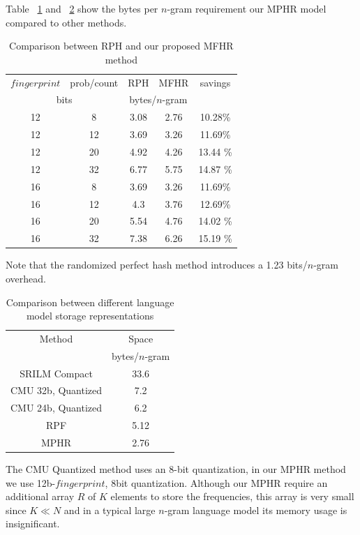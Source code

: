 \documentclass[10pt, a4paper]{article}
\begin{document}
Table ~\ref{table:usage} and ~\ref{table:comparison} show the bytes per $n$-gram requirement our MPHR model compared to other methods.
%
\begin{table}[tbp]
\centering
\begin{tabular}{|c|c|c|c|c|}
\hline
 $fingerprint$&prob/count&RPH&MFHR& savings\\
\multicolumn{2}{|c|}{bits}&\multicolumn{2}{|c|}{bytes/$n$-gram}&\\
\hline
12 & 8 &  3.08  &  2.76   & 10.28\% \\
12 & 12 &  3.69 &  3.26   & 11.69\% \\
12 & 20 &  4.92  &  4.26   & 13.44 \% \\
12 & 32 &  6.77  &  5.75   & 14.87 \% \\
\hline
16 & 8 &  3.69  &  3.26   & 11.69\% \\
16 & 12 &  4.3 &  3.76   & 12.69\% \\
16 & 20 &  5.54  &  4.76   & 14.02 \% \\
16 & 32 &  7.38  &  6.26   & 15.19 \% \\
\hline
\end{tabular}
\caption{Comparison between  RPH and our proposed MFHR method}
\label{table:usage}
\end{table}
%
Note that the randomized perfect hash method introduces a 1.23 bits/$n$-gram overhead.
%
\begin{table}[tbp]
\centering
\begin{tabular}{|c|c|}
\hline
Method&Space\\
&bytes/$n$-gram\\
\hline
SRILM Compact&33.6\\
CMU 32b, Quantized&7.2\\
CMU 24b, Quantized&6.2\\
RPF & 5.12\\
MPHR & 2.76\\
\hline
\end{tabular}
\caption{Comparison between different language model storage representations}
\label{table:comparison}
\end{table}
%
The CMU Quantized method uses an 8-bit quantization, in our MPHR method we use 12b-$fingerprint$,
8bit quantization.
%
Although our MPHR require an additional array $R$ of $K$ elements to store the frequencies, 
this array is very small since $K\ll N$ and in a typical large $n$-gram language model its memory
usage is insignificant.




\end{document}
